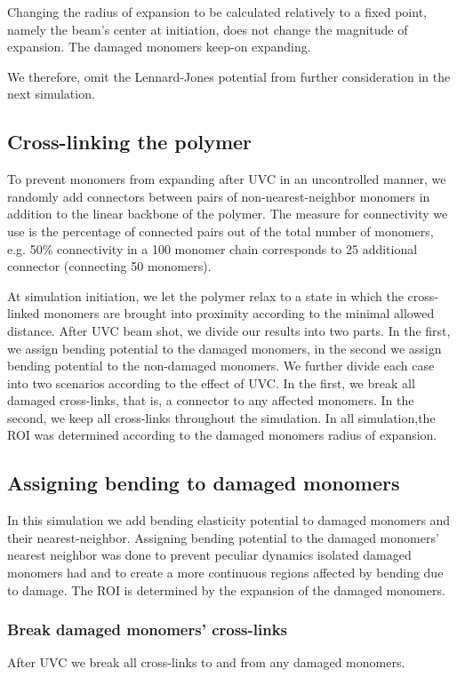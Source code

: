 \documentclass[12pt]{report}
\begin{document}
      Changing the radius of expansion to be calculated relatively to a fixed point, namely the beam's center at initiation, does not change the magnitude of expansion. The damaged monomers keep-on expanding. 
      
      We therefore, omit the Lennard-Jones potential from further consideration in the next simulation.


   \subsection{Cross-linking the polymer}
    To prevent monomers from expanding after UVC in an uncontrolled manner, we randomly add connectors between pairs of non-nearest-neighbor monomers in addition to the linear backbone of the polymer. The measure for connectivity we use is the percentage of connected pairs out of the total number of monomers, e.g. 50\% connectivity in a 100 monomer chain corresponds to 25 additional connector (connecting 50 monomers). 
	
	At simulation initiation, we let the polymer relax to a state in which the cross-linked monomers are brought into proximity according to the minimal allowed distance. After UVC beam shot, we divide our results into two parts. In the first, we assign bending potential to the damaged monomers, in the second we assign bending potential to the non-damaged monomers. We further divide each case into two scenarios according to the effect of UVC. In the first, we break all damaged cross-links, that is, a connector to any affected monomers. In the second, we keep all cross-links throughout the simulation. 
	In all simulation,the ROI was determined according to the damaged monomers radius of expansion.
	
	\subsection{Assigning bending to damaged monomers}
	In this simulation we add bending elasticity potential to damaged monomers and their nearest-neighbor. Assigning bending potential to the damaged monomers' nearest neighbor was done to prevent peculiar dynamics isolated damaged monomers had and to create a more continuous regions affected by bending due to damage. The ROI is determined by the expansion of the damaged monomers. 
	
	\subsubsection{Break damaged monomers' cross-links}
	After UVC we break all cross-links to and from any damaged monomers. 
		
\end{document}
